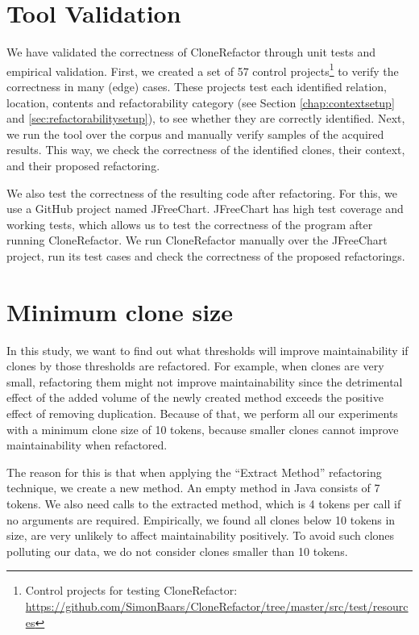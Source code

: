 \section{Tool Validation}
We have validated the correctness of CloneRefactor through unit tests and empirical validation. First, we created a set of 57 control projects\footnote{Control projects for testing CloneRefactor: \url{https://github.com/SimonBaars/CloneRefactor/tree/master/src/test/resources}} to verify the correctness in many (edge) cases. These projects test each identified relation, location, contents and refactorability category (see Section \ref{chap:contextsetup} and \ref{sec:refactorabilitysetup}), to see whether they are correctly identified. Next, we run the tool over the corpus and manually verify samples of the acquired results. This way, we check the correctness of the identified clones, their context, and their proposed refactoring.

We also test the correctness of the resulting code after refactoring. For this, we use a GitHub project named JFreeChart. JFreeChart has high test coverage and working tests, which allows us to test the correctness of the program after running CloneRefactor. We run CloneRefactor manually over the JFreeChart project, run its test cases and check the correctness of the proposed refactorings.

\section{Minimum clone size}
In this study, we want to find out what thresholds will improve maintainability if clones by those thresholds are refactored. For example, when clones are very small, refactoring them might not improve maintainability since the detrimental effect of the added volume of the newly created method exceeds the positive effect of removing duplication. Because of that, we perform all our experiments with a minimum clone size of 10 tokens, because smaller clones cannot improve maintainability when refactored.

The reason for this is that when applying the ``Extract Method'' refactoring technique, we create a new method. An empty method in Java consists of 7 tokens. We also need calls to the extracted method, which is 4 tokens per call if no arguments are required. Empirically, we found all clones below 10 tokens in size, are very unlikely to affect maintainability positively. To avoid such clones polluting our data, we do not consider clones smaller than 10 tokens.

